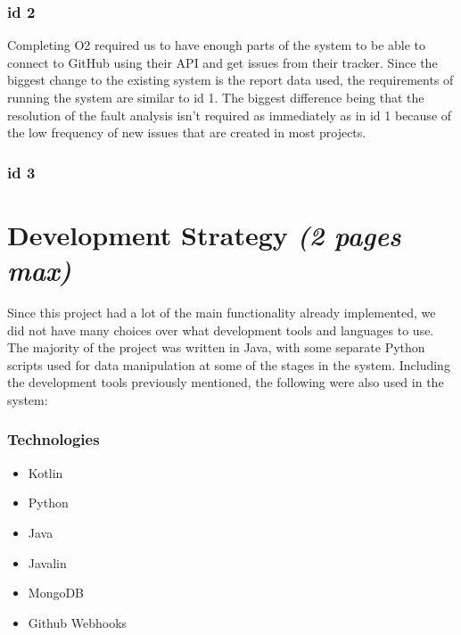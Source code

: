 \documentclass[12pt]{article}
\providecommand{\tightlist}{%
  \setlength{\itemsep}{0pt}\setlength{\parskip}{0pt}}
\begin{document}
\hypertarget{id-2}{%
\subsubsection{id 2}\label{id-2}}

Completing O2 required us to have enough parts of the system to be able
to connect to GitHub using their API and get issues from their tracker.
Since the biggest change to the existing system is the report data used,
the requirements of running the system are similar to id 1. The biggest
difference being that the resolution of the fault analysis isn't
required as immediately as in id 1 because of the low frequency of new
issues that are created in most projects.

\hypertarget{id-3}{%
\subsubsection{id 3}\label{id-3}}

\hypertarget{development-strategy-2-pages-max}{%
\section{\texorpdfstring{Development Strategy \emph{(2 pages
max)}}{Development Strategy (2 pages max)}}\label{development-strategy-2-pages-max}}

Since this project had a lot of the main functionality already
implemented, we did not have many choices over what development tools
and languages to use. The majority of the project was written in Java,
with some separate Python scripts used for data manipulation at some of
the stages in the system. Including the development tools previously
mentioned, the following were also used in the system:

\hypertarget{technologies}{%
\subsubsection{Technologies}\label{technologies}}

\begin{itemize}
\tightlist
\item
  Kotlin
\item
  Python
\item
  Java
\item
  Javalin
\item
  MongoDB
\item
  Github Webhooks
\end{itemize}
\end{document}
